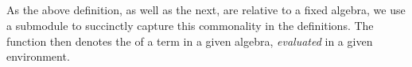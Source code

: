 \begin{code}
\\
%
\>[17]\AgdaSymbol{;}\AgdaSpace{}%
\AgdaSpace{}%
\AgdaSymbol{=}\AgdaSpace{}%
%
\>[43]\AgdaSymbol{\{}\AgdaSpace{}%
%
\>[52]\AgdaSymbol{=}\AgdaSpace{}%
\AgdaSpace{}%
\AgdaBound{\AgdaUnderscore{}}%
\>[63]\AgdaSpace{}%
\<%
\\
%
\>[43]\AgdaSymbol{;}\AgdaSpace{}%
%
\>[52]\AgdaSymbol{=}\AgdaSpace{}%
\AgdaSpace{}%
\AgdaSpace{}%
%
\>[63]\AgdaSpace{}%
\AgdaSpace{}%
\AgdaSymbol{(}\AgdaSpace{}%
\AgdaSymbol{)}\<%
\\
%
\>[43]\AgdaSymbol{;}\AgdaSpace{}%
%
\>[52]\AgdaSymbol{=}\AgdaSpace{}%
\AgdaSpace{}%
\AgdaSpace{}%
\AgdaSpace{}%
%
\>[63]\AgdaSpace{}%
\AgdaSpace{}%
\AgdaSymbol{(}\AgdaSpace{}%
\AgdaSymbol{)(}\AgdaSpace{}%
\AgdaSymbol{)}\AgdaSpace{}%
\AgdaSymbol{\}\}}\<%
\\
\>[0]\<%
\end{code}
As the above definition, as well as the next, are relative to a fixed algebra, we use
a submodule to succinctly capture this commonality in the definitions.
The function  then denotes the  of
a term in a given algebra, \emph{evaluated} in a given environment.

